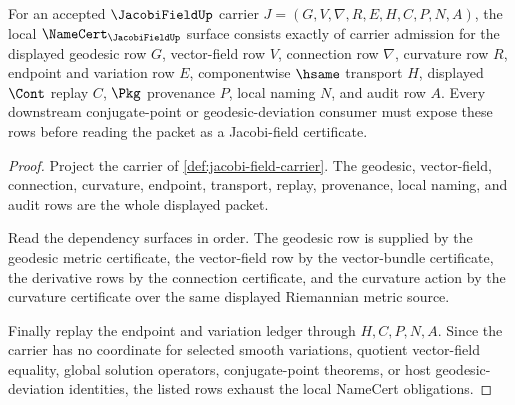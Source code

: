 \begin{theorem}
\label{thm:jacobi-field-namecert-obligations}
For an accepted $\JacobiFieldUp$ carrier $J=(G,V,\nabla,R,E,H,C,P,N,A)$, the local $\NameCert_{\JacobiFieldUp}$ surface consists exactly of carrier admission for the displayed geodesic row $G$, vector-field row $V$, connection row $\nabla$, curvature row $R$, endpoint and variation row $E$, componentwise $\hsame$ transport $H$, displayed $\Cont$ replay $C$, $\Pkg$ provenance $P$, local naming $N$, and audit row $A$. Every downstream conjugate-point or geodesic-deviation consumer must expose these rows before reading the packet as a Jacobi-field certificate.
\end{theorem}
\begin{proof}
Project the carrier of \autoref{def:jacobi-field-carrier}. The geodesic, vector-field, connection, curvature, endpoint, transport, replay, provenance, local naming, and audit rows are the whole displayed packet.

Read the dependency surfaces in order. The geodesic row is supplied by the geodesic metric certificate, the vector-field row by the vector-bundle certificate, the derivative rows by the connection certificate, and the curvature action by the curvature certificate over the same displayed Riemannian metric source.

Finally replay the endpoint and variation ledger through $H,C,P,N,A$. Since the carrier has no coordinate for selected smooth variations, quotient vector-field equality, global solution operators, conjugate-point theorems, or host geodesic-deviation identities, the listed rows exhaust the local NameCert obligations.
\end{proof}




